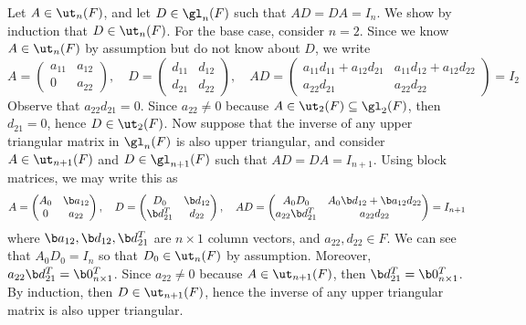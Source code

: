 \begin{sol}
    Let $A \in \ut_n(F)$, and let $D \in \gl_n(F)$ such that $AD = DA = I_n$. We show by induction that $D \in \ut_n(F)$. For the base case, consider $n = 2$. Since we know $A \in \ut_n(F)$ by assumption but do not know about $D$, we write
    \[A =
    \begin{pmatrix}
        a_{11} & a_{12} \\
        0 & a_{22}
    \end{pmatrix}, \quad
    D =
    \begin{pmatrix}
        d_{11} & d_{12} \\
        d_{21} & d_{22}
    \end{pmatrix}, \quad
    AD = 
    \begin{pmatrix}
        a_{11} d_{11} + a_{12} d_{21} & a_{11} d_{12} + a_{12} d_{22} \\
        a_{22} d_{21} & a_{22} d_{22}
    \end{pmatrix} = I_2
    \]
    Observe that $a_{22}d_{21} = 0$. Since $a_{22} \neq 0$ because $A \in \ut_2(F) \subseteq \gl_2(F)$, then $d_{21} = 0$, hence $D \in \ut_2(F)$. Now suppose that the inverse of any upper triangular matrix in $\gl_n(F)$ is also upper triangular, and consider $A \in \ut_{n + 1}(F)$ and $D \in \gl_{n + 1}(F)$ such that $AD = DA = I_{n + 1}$. Using block matrices, we may write this as
    \[A = 
    \begin{pmatrix}
        A_0 & \b a_{12} \\
        0 & a_{22}
    \end{pmatrix}, \quad
    D = 
    \begin{pmatrix}
        D_0 & \b d_{12} \\
        \b d_{21}^T & d_{22}
    \end{pmatrix}, \quad
    AD = 
    \begin{pmatrix}
        A_0 D_0 & A_0 \b d_{12} + \b a_{12} d_{22} \\
        a_{22} \b d_{21}^T & a_{22} d_{22}
    \end{pmatrix} = I_{n + 1}
    \]
    where $\b a_{12}, \b d_{12}, \b d_{21}^T$ are $n \times 1$ column vectors, and $a_{22}, d_{22} \in F$. We can see that $A_0 D_0 = I_n$ so that $D_0 \in \ut_n(F)$ by assumption. Moreover, $a_{22} \b d_{21}^T = \b 0_{n \times 1}^T$. Since $a_{22} \neq 0$ because $A \in \ut_{n + 1}(F)$, then $\b d_{21}^T = \b 0_{n \times 1}^T$. By induction, then $D \in \ut_{n + 1}(F)$, hence the inverse of any upper triangular matrix is also upper triangular.
\end{sol}

